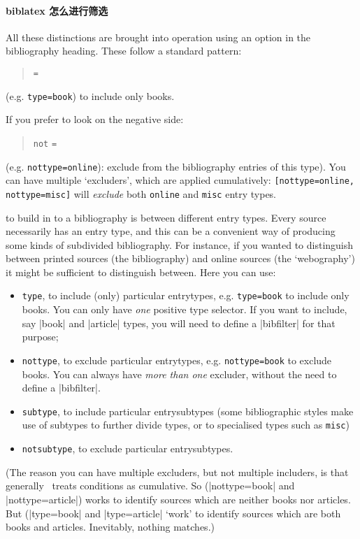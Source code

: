 \paragraph{biblatex 怎么进行筛选} All these distinctions are brought
into operation using an option in the bibliography heading. These
follow a standard pattern:
\begin{quote}
 \texttt{=} 
\end{quote}
(e.g. \texttt{type=book}) to include only books.

If you prefer to look on the negative side:
\begin{quote}
\texttt{not} \texttt{=} 
\end{quote}
(e.g. \texttt{nottype=online}): exclude from the bibliography entries of
this type). You can have multiple `excluders', which are applied
cumulatively: \texttt{{[}nottype=online,} \texttt{nottype=misc{]}} will
\emph{exclude} both \texttt{online} and \texttt{misc} entry types.

 to build in to a bibliography
is between different entry types. Every source necessarily has an
entry type, and this can be a convenient way of producing some kinds
of subdivided bibliography. For instance, if you wanted to distinguish
between printed sources (the bibliography) and online sources (the
`webography') it might be sufficient to distinguish between. Here you
can use:
\begin{itemize}
\item \texttt{type}, to include (only) particular entrytypes, e.g.
  \texttt{type=book} to include only books. You can only have
  \emph{one} positive type selector. If you want to include, say
  |book| and |article| types, you will need to define a |bibfilter|
  for that purpose;
\item \texttt{nottype}, to exclude particular entrytypes,
  e.g. \texttt{nottype=book} to exclude books. You can always have
  \emph{more than one} excluder, without the need to define a
  |bibfilter|.
\item \texttt{subtype}, to include particular entrysubtypes (some
  bibliographic styles make use of subtypes to further divide types,
  or to specialised types such as \texttt{misc})
\item \texttt{notsubtype}, to exclude particular entrysubtypes.
\end{itemize}
(The reason you can have multiple excluders, but not multiple
includers, is that generally \biblatex\ treats conditions as
cumulative. So (|nottype=book| and |nottype=article|) works to
identify sources which are neither books nor articles. But
(|type=book| and |type=article| `work' to identify sources which are
both books and articles. Inevitably, nothing matches.)

